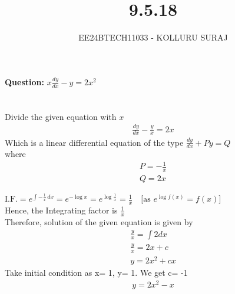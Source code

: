 \documentclass[journal]{IEEEtran}
\numberwithin{equation}{enumi}
\numberwithin{figure}{enumi}
\begin{document}

\title{9.5.18}
\author{EE24BTECH11033 - KOLLURU SURAJ}
{\let\newpage\relax\maketitle}
\textbf{Question:} 
$x\frac{dy}{dx}-y=2x^2$
\\\\
\solution\\
Divide the given equation with $x$
\begin{align}
    \frac{dy}{dx}-\frac{y}{x}=2x\label{1} 
\end{align}
Which is a linear differential equation of the type $\frac{dy}{dx} +Py=Q$\\ where
\begin{align}
P= -\frac{1}{x}\\
Q=2x
\end{align}

$\text{I.F.} = e^{\int -\frac{1}{x} \, dx} = e^{-\log x} = e^{\log \frac{1}{x}} = \frac{1}{x} \quad \text{[as } e^{\log f(x)} = f(x) \text{]}$\\

Hence, the Integrating factor is $\frac{1}{x}$\\
Therefore, solution of the given equation is given by\\
\begin{align}
    \frac{y}{x}=\int 2dx\\
    \frac{y}{x}=2x+c\\
    y=2x^2+cx
\end{align}
Take initial condition as x= 1, y= 1. We get c= -1
\begin{align}
    y=2x^2- x
\end{align}
\end{document}

